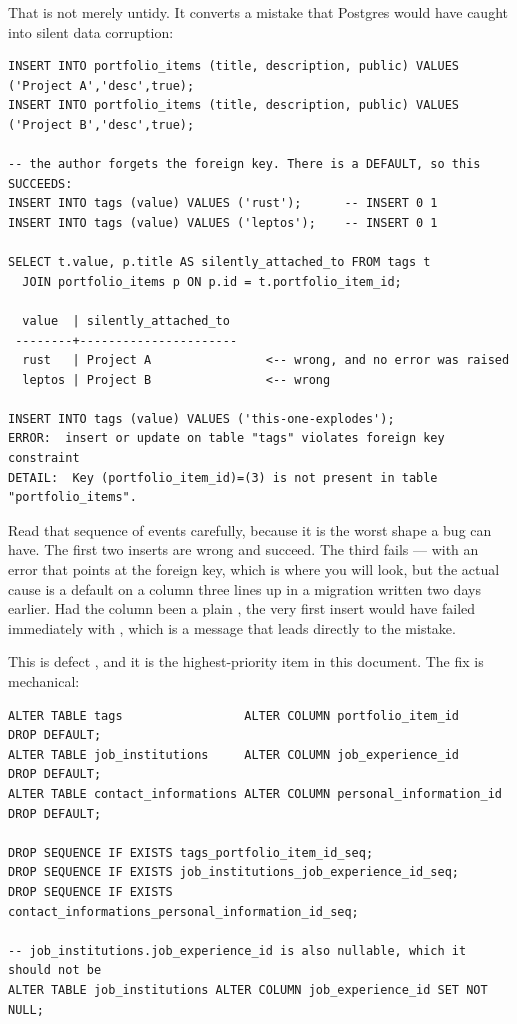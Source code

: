 That is not merely untidy. It converts a mistake that Postgres would have caught into silent
data corruption:

\begin{verified}
\begin{lstlisting}[style=out]
INSERT INTO portfolio_items (title, description, public) VALUES ('Project A','desc',true);
INSERT INTO portfolio_items (title, description, public) VALUES ('Project B','desc',true);

-- the author forgets the foreign key. There is a DEFAULT, so this SUCCEEDS:
INSERT INTO tags (value) VALUES ('rust');      -- INSERT 0 1
INSERT INTO tags (value) VALUES ('leptos');    -- INSERT 0 1

SELECT t.value, p.title AS silently_attached_to FROM tags t
  JOIN portfolio_items p ON p.id = t.portfolio_item_id;

  value  | silently_attached_to
 --------+----------------------
  rust   | Project A                <-- wrong, and no error was raised
  leptos | Project B                <-- wrong

INSERT INTO tags (value) VALUES ('this-one-explodes');
ERROR:  insert or update on table "tags" violates foreign key constraint
DETAIL:  Key (portfolio_item_id)=(3) is not present in table "portfolio_items".
\end{lstlisting}
\end{verified}

Read that sequence of events carefully, because it is the worst shape a bug can have. The first two
inserts are wrong and succeed. The third fails --- with an error that points at the foreign key,
which is where you will look, but the actual cause is a default on a column three lines up in a
migration written two days earlier. Had the column been a plain , the very
first insert would have failed immediately with , which is a message that leads directly to the mistake.

This is defect , and it is the highest-priority item in this document. The fix is
mechanical:

\begin{lstlisting}[style=sql,caption={A migration that removes the three stray defaults and drops the sequences.}]
ALTER TABLE tags                 ALTER COLUMN portfolio_item_id       DROP DEFAULT;
ALTER TABLE job_institutions     ALTER COLUMN job_experience_id       DROP DEFAULT;
ALTER TABLE contact_informations ALTER COLUMN personal_information_id DROP DEFAULT;

DROP SEQUENCE IF EXISTS tags_portfolio_item_id_seq;
DROP SEQUENCE IF EXISTS job_institutions_job_experience_id_seq;
DROP SEQUENCE IF EXISTS contact_informations_personal_information_id_seq;

-- job_institutions.job_experience_id is also nullable, which it should not be
ALTER TABLE job_institutions ALTER COLUMN job_experience_id SET NOT NULL;
\end{lstlisting}

